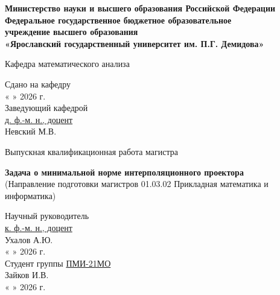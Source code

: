 \documentclass[a4paper,12pt]{article}
\theoremstyle{indented}
\begin{document}
\setcounter{page}{1}
\pagestyle{empty}
\begin{center}
\textbf{Министерство науки и высшего образования Российской Федерации}
\\
\vspace{0.5cm}
\textbf{Федеральное государственное бюджетное образовательное\\
учреждение высшего образования} \\
\textbf{«Ярославский государственный университет им. П.Г. Демидова»}

\vspace{0.5cm}

Кафедра математического анализа
\vfill

\begin{flushright}
  Сдано на кафедру\\
  « \underline{\hspace{0.8cm}} » \underline{\hspace{3cm}} 2026 г.\\
  Заведующий кафедрой \\
  \underline{д. ф.-м. н., доцент }\\
  \underline{\hspace{3.4cm}} Невский М.В.\\
\end{flushright}
\vfill

Выпускная квалификационная работа магистра \\

\vspace{0.5cm}

\textbf{Задача о минимальной норме интерполяционного проектора} \\
(Направление подготовки магистров 01.03.02 Прикладная математика и информатика)
\vfill


\bigskip


\end{center}

\begin{flushright}
Научный руководитель\\
\underline{к. ф.-м. н., доцент }\\
\underline{\hspace{3.4cm}} Ухалов А.Ю.\\
« \underline{\hspace{0.8cm}} » \underline{\hspace{3cm}} 2026 г.\\
\vspace{1.5cm}
Студент группы \underline{ПМИ-21МО}\\
\underline{\hspace{3.5cm}} Зайков И.В. \\
« \underline{\hspace{0.8cm}} » \underline{\hspace{3cm}} 2026 г.\\
\end{flushright}
\end{document}
